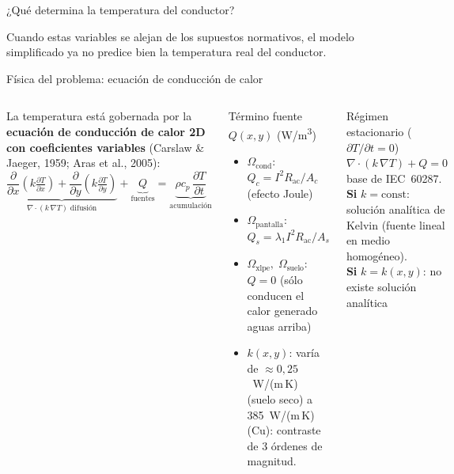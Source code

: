 \documentclass[aspectratio=169]{beamer}
\newcommand{\refcite}[1]{{\footnotesize\color{gray!70!black} #1}}
\begin{document}
\begin{frame}{¿Qué determina la temperatura del conductor?}
\vspace{0.2em}
\begin{exampleblock}{}
\centering\small
Cuando estas variables se alejan de los supuestos normativos,
el modelo simplificado ya no predice bien la temperatura real del conductor.
\end{exampleblock}
\end{frame}

\begin{frame}{Física del problema: ecuación de conducción de calor}
\begin{columns}[T]
\justifying\small
La temperatura está gobernada por la
\textbf{ecuación de conducción de calor 2D con coeficientes variables}
\refcite{(Carslaw \& Jaeger, 1959; Aras et al., 2005)}:
\begin{equation*}
\underbrace{
  \frac{\partial}{\partial x}\!\left(k\tfrac{\partial T}{\partial x}\right)
 +\frac{\partial}{\partial y}\!\left(k\tfrac{\partial T}{\partial y}\right)
}_{\nabla\cdot(k\,\nabla T)\;\text{difusión}}
+\underbrace{Q}_{\text{fuentes}}
= \underbrace{\rho c_p\,\frac{\partial T}{\partial t}}_{\text{acumulación}}
\end{equation*}
\begin{block}{\scriptsize Término fuente $Q(x,y)$ (W/m\textsuperscript{3})}
\scriptsize
\begin{itemize}[leftmargin=*,itemsep=1pt]
    \item $\Omega_\text{cond}$:\enspace $Q_c = I^2 R_\text{ac}/A_c$
          \hfill (efecto Joule)
    \item $\Omega_\text{pantalla}$:\enspace $Q_s = \lambda_1 I^2
          R_\text{ac}/A_s$
    \item $\Omega_\text{xlpe},\;\Omega_\text{suelo}$:\enspace $Q=0$
          (sólo conducen el calor generado aguas arriba)
    \item $k(x,y)$: varía de $\approx0{,}25$~W/(m\,K) (suelo seco) a
          385~W/(m\,K) (Cu): contraste de 3 órdenes de magnitud.
\end{itemize}
\end{block}
\begin{block}{\scriptsize Régimen estacionario ($\partial T/\partial t=0$)}
\scriptsize
$\nabla\cdot(k\,\nabla T)+Q=0$ \quad base de IEC~60287.\\[3pt]
\textbf{Si} $k=\text{const}$: solución analítica de Kelvin
(fuente lineal en medio homogéneo).\\[3pt]
\textbf{Si} $k=k(x,y)$: no existe solución analítica

\end{block}
\end{columns}
\end{frame}
\end{document}
